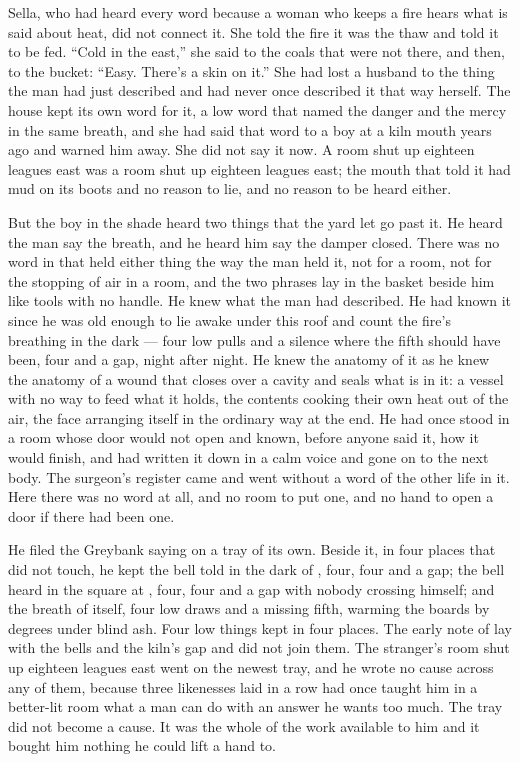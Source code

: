 Sella, who had heard every word because a woman who keeps a fire hears what is said about heat, did not connect it. She told the fire it was the thaw and told it to be fed. “Cold in the east,” she said to the coals that were not there, and then, to the bucket: “Easy. There's a skin on it.” She had lost a husband to the thing the man had just described and had never once described it that way herself. The house kept its own word for it, a low word that named the danger and the mercy in the same breath, and she had said that word to a boy at a kiln mouth years ago and warned him away. She did not say it now. A room shut up eighteen leagues east was a room shut up eighteen leagues east; the mouth that told it had mud on its boots and no reason to lie, and no reason to be heard either.

But the boy in the shade heard two things that the yard let go past it. He heard the man say the breath, and he heard him say the damper closed. There was no word in  that held either thing the way the man held it, not for a room, not for the stopping of air in a room, and the two phrases lay in the basket beside him like tools with no handle. He knew what the man had described. He had known it since he was old enough to lie awake under this roof and count the fire's breathing in the dark --- four low pulls and a silence where the fifth should have been, four and a gap, night after night. He knew the anatomy of it as he knew the anatomy of a wound that closes over a cavity and seals what is in it: a vessel with no way to feed what it holds, the contents cooking their own heat out of the air, the face arranging itself in the ordinary way at the end. He had once stood in a room whose door would not open and known, before anyone said it, how it would finish, and had written it down in a calm voice and gone on to the next body. The surgeon's register came and went without a word of the other life in it. Here there was no word at all, and no room to put one, and no hand to open a door if there had been one.

He filed the Greybank saying on a tray of its own. Beside it, in four places that did not touch, he kept the bell told in the dark of , four, four and a gap; the bell heard in the square at , four, four and a gap with nobody crossing himself; and the breath of  itself, four low draws and a missing fifth, warming the boards by degrees under blind ash. Four low things kept in four places. The early note of  lay with the bells and the kiln's gap and did not join them. The stranger's room shut up eighteen leagues east went on the newest tray, and he wrote no cause across any of them, because three likenesses laid in a row had once taught him in a better-lit room what a man can do with an answer he wants too much. The tray did not become a cause. It was the whole of the work available to him and it bought him nothing he could lift a hand to.


